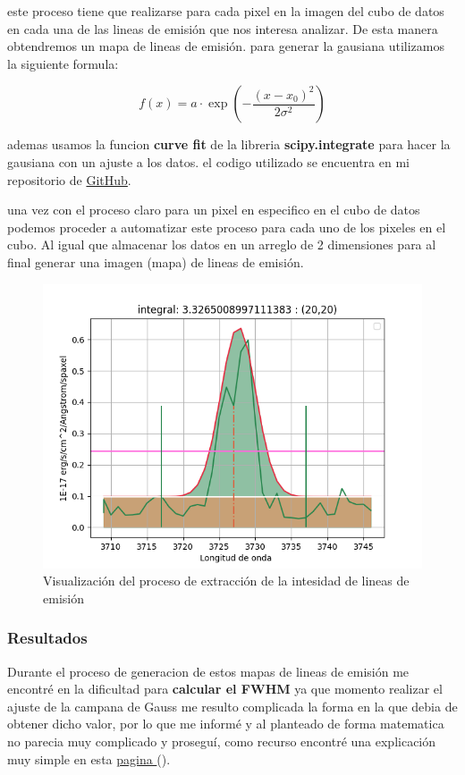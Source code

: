 \documentclass[9pt,twocolumn,a4paper]{opticajnl}
\begin{document}
este proceso tiene que realizarse para cada pixel en la imagen del cubo de datos en cada una de las lineas de emisión que nos interesa analizar. De esta manera obtendremos un mapa de lineas de emisión.
para generar la gausiana utilizamos la siguiente formula:

$$
f(x) = a \cdot \exp\left( -\frac{(x - x_0)^2}{2\sigma^2} \right)
$$

ademas usamos la funcion \textbf{curve fit} de la libreria \textbf{scipy.integrate} para hacer la gausiana con un ajuste a los datos.
el codigo utilizado se encuentra en mi repositorio de \href{https://github.com/renatosanz/delfin}{GitHub}. 

una vez con el proceso claro para un pixel en especifico en el cubo de datos podemos proceder a automatizar este proceso para cada uno de los pixeles en el cubo. Al igual que almacenar los datos en un arreglo de 2 dimensiones para al final generar una imagen (mapa) de lineas de emisión.

\begin{figure}
    \centering
    \includegraphics[width=1\linewidth]{extraccion_linea.png}
    \caption{Visualización del proceso de extracción de la intesidad de lineas de emisión}
    \label{fig:extraccion_linea.}
\end{figure}


\subsubsection*{Resultados}
Durante el proceso de generacion de estos mapas de lineas de emisión me encontré en la dificultad para \textbf{calcular el FWHM } ya que momento realizar el ajuste de la campana de Gauss me resulto complicada la forma en la que debia de obtener dicho valor, por lo que me informé y al planteado de forma matematica no parecia muy complicado y proseguí, como recurso encontré una explicación muy simple en esta \href{https://www.pulstec.net/what-is-full-width-at-half-maximum/}{pagina } (\cite{suzuki2023fwhm}).
\end{document}
